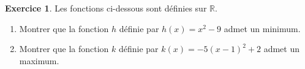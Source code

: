 \documentclass{article}
\theoremstyle{definition}
\newtheorem{exercice}{Exercice}
\begin{document}
\vspace{-1em}
\begin{exercice}
  Les fonctions ci-dessous sont définies sur $\mathbb{R}$.
  \begin{enumerate}
    \item Montrer que la fonction $h$ définie par $h(x)=x^2-9$ admet un minimum.
    \item Montrer que la fonction $k$ définie par $k(x)=-5(x-1)^2+2$ admet un maximum.
  \end{enumerate}
\end{exercice}

\begin{center}
\end{center}
\end{document}
